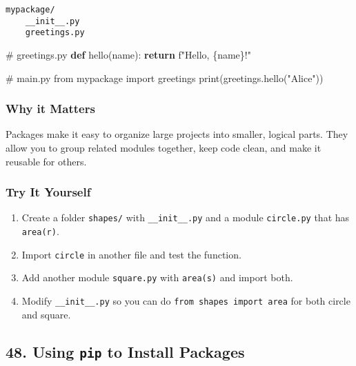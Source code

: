 \documentclass[
  letterpaper,
  DIV=11,
  numbers=noendperiod]{scrreprt}
\newenvironment{Shaded}{\begin{snugshade}}{\end{snugshade}}
\newcommand{\BuiltInTok}[1]{\textcolor[rgb]{0.00,0.23,0.31}{#1}}
\newcommand{\CommentTok}[1]{\textcolor[rgb]{0.37,0.37,0.37}{#1}}
\newcommand{\ControlFlowTok}[1]{\textcolor[rgb]{0.00,0.23,0.31}{\textbf{#1}}}
\newcommand{\ImportTok}[1]{\textcolor[rgb]{0.00,0.46,0.62}{#1}}
\newcommand{\KeywordTok}[1]{\textcolor[rgb]{0.00,0.23,0.31}{\textbf{#1}}}
\newcommand{\NormalTok}[1]{\textcolor[rgb]{0.00,0.23,0.31}{#1}}
\newcommand{\SpecialCharTok}[1]{\textcolor[rgb]{0.37,0.37,0.37}{#1}}
\newcommand{\SpecialStringTok}[1]{\textcolor[rgb]{0.13,0.47,0.30}{#1}}
\newcommand{\StringTok}[1]{\textcolor[rgb]{0.13,0.47,0.30}{#1}}
\providecommand{\tightlist}{%
  \setlength{\itemsep}{0pt}\setlength{\parskip}{0pt}}
\begin{document}
\begin{verbatim}
mypackage/
    __init__.py
    greetings.py
\end{verbatim}

\begin{Shaded}
\begin{Highlighting}[]
\CommentTok{\# greetings.py}
\KeywordTok{def}\NormalTok{ hello(name):}
    \ControlFlowTok{return} \SpecialStringTok{f"Hello, }\SpecialCharTok{\{}\NormalTok{name}\SpecialCharTok{\}}\SpecialStringTok{!"}

\CommentTok{\# main.py}
\ImportTok{from}\NormalTok{ mypackage }\ImportTok{import}\NormalTok{ greetings}
\BuiltInTok{print}\NormalTok{(greetings.hello(}\StringTok{"Alice"}\NormalTok{))}
\end{Highlighting}
\end{Shaded}

\subsubsection{Why it Matters}\label{why-it-matters-46}

Packages make it easy to organize large projects into smaller, logical
parts. They allow you to group related modules together, keep code
clean, and make it reusable for others.

\subsubsection{Try It Yourself}\label{try-it-yourself-46}

\begin{enumerate}
\def\labelenumi{\arabic{enumi}.}
\tightlist
\item
  Create a folder \texttt{shapes/} with \texttt{\_\_init\_\_.py} and a
  module \texttt{circle.py} that has \texttt{area(r)}.
\item
  Import \texttt{circle} in another file and test the function.
\item
  Add another module \texttt{square.py} with \texttt{area(s)} and import
  both.
\item
  Modify \texttt{\_\_init\_\_.py} so you can do
  \texttt{from\ shapes\ import\ area} for both circle and square.
\end{enumerate}

\subsection{\texorpdfstring{48. Using \texttt{pip} to Install
Packages}{48. Using pip to Install Packages}}\label{using-pip-to-install-packages}
\end{document}
